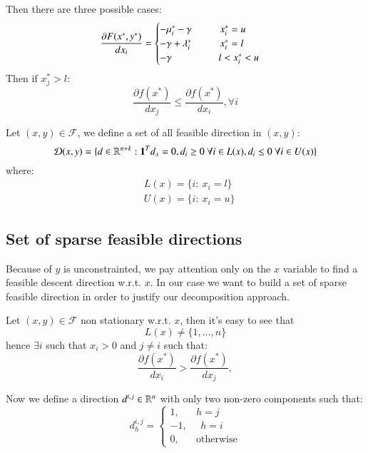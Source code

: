 Then there are three possible cases:
\begin{equation}
 \frac{\partial F(x^*,y^*)}{dx_i} = \begin{cases} -\mu_i^* -\gamma \hspace{1cm} x^*_i =u \\
 -\gamma+\lambda^*_i \hspace{1cm} x^*_i =l \\
 -\gamma \hspace{1.65cm} l<x^*_i <u 
\end{cases}
\end{equation}
Then if $x^*_j>l$:
\begin{equation}
 \frac{\partial f(x^*)}{dx_j} \le \frac{\partial f(x^*)}{dx_i}, \forall i
\end{equation}

Let $(x,y) \in \mathcal{F}$, we define a set of all feasible direction in $(x,y)$:
\begin{equation}
 \mathcal{D}(x,y)=\{ d \in \mathbb{R}^{n+k}: \mathbf{1}^Td_x=0, d_i\ge 0 \ \forall i \in L(x), d_i\le 0 \ \forall i \in U(x)\}
\end{equation}
where:
\begin{equation}
 \begin{aligned}
  &L(x)=\{ i: \ x_i=l\}\\
  &U(x)=\{ i: \ x_i=u\}
 \end{aligned}
\end{equation}



\subsection{Set of sparse feasible directions}
Because of $y$ is unconstrainted, we pay attention only on the $x$ variable to find a feasible descent direction w.r.t. $x$. 
In our case we want to build a set of sparse feasible direction in order to justify our decomposition approach.

Let $(x,y) \in \mathcal{F}$ non stationary w.r.t. $x$, then it's easy to see that
\begin{equation}
 L(x)\ne \{1,\ldots,n\}
\end{equation}
hence $\exists i$ such that $x_i>0$ and $j \ne i$ such that:
\begin{equation}
 \frac{\partial f(x^*)}{dx_i} > \frac{\partial f(x^*)}{dx_j}, 
\end{equation}

Now we define a direction $d^{i,j} \in \mathbb{R}^n$ with only two non-zero components such that:
\begin{equation}\label{eq:direction}
d_h^{i,j}= 
\begin{cases}
1, \quad \text{    } h=j\\
-1, \text{    } \text{    } h=i\\
0, \quad \text{    } \text{otherwise}
\end{cases}
\end{equation}

